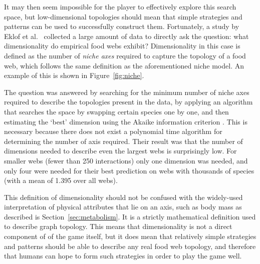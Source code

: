 It may then seem impossible for the player to effectively explore this search space, but low-dimensional topologies should mean that simple strategies and patterns can be used to successfully construct them.
Fortunately, a study by Eklof et al.\ \cite{Eklof2013} collected a large amount of data to directly ask the question: what dimensionality do empirical food webs exhibit? Dimensionality in this case is defined as the number of \emph{niche axes} required to capture the topology of a food web, which follows the same definition as the aforementioned niche model. An example of this is shown in Figure~\ref{fig:niche}.

The question was answered by searching for the minimum number of niche axes required to describe the topologies present in the data, by applying an algorithm that searches the space by swapping certain species one by one, and then estimating the `best' dimension using the Akaike information criterion \cite{Eklof2013}. This is necessary because there does not exist a polynomial time algorithm for determining the number of axis required.
Their result was that the number of dimensions needed to describe even the largest webs is surprisingly low. For smaller webs (fewer than 250 interactions) only one dimension was needed, and only four were needed for their best prediction on webs with thousands of species (with a mean of 1.395 over all webs).

This definition of dimensionality should not be confused with the widely-used interpretation of physical attributes that lie on an axis, such as body mass as described is Section~\ref{sec:metabolism}. It is a strictly mathematical definition used to describe graph topology.
This means that dimensionality is not a direct component of of the game itself, but it does mean that relatively simple strategies and patterns should be able to describe any real food web topology, and therefore that humans can hope to form such strategies in order to play the game well.

